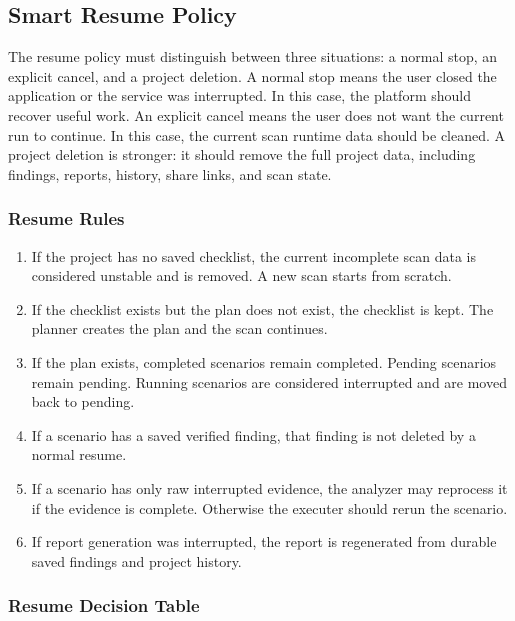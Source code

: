 \documentclass[12pt,a4paper]{report}
\begin{document}
\subsection{Smart Resume Policy}

The resume policy must distinguish between three situations: a normal stop, an explicit
cancel, and a project deletion. A normal stop means the user closed the application or
the service was interrupted. In this case, the platform should recover useful work. An
explicit cancel means the user does not want the current run to continue. In this case,
the current scan runtime data should be cleaned. A project deletion is stronger: it
should remove the full project data, including findings, reports, history, share links,
and scan state.

\subsubsection{Resume Rules}

\begin{enumerate}
    \item If the project has no saved checklist, the current incomplete scan data is
    considered unstable and is removed. A new scan starts from scratch.
    \item If the checklist exists but the plan does not exist, the checklist is kept.
    The planner creates the plan and the scan continues.
    \item If the plan exists, completed scenarios remain completed. Pending scenarios
    remain pending. Running scenarios are considered interrupted and are moved back to
    pending.
    \item If a scenario has a saved verified finding, that finding is not deleted by a
    normal resume.
    \item If a scenario has only raw interrupted evidence, the analyzer may reprocess
    it if the evidence is complete. Otherwise the executer should rerun the scenario.
    \item If report generation was interrupted, the report is regenerated from durable
    saved findings and project history.
\end{enumerate}

\subsubsection{Resume Decision Table}
\end{document}
